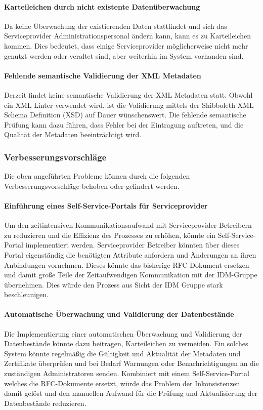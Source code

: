 \paragraph{Karteileichen durch nicht existente Datenüberwachung}
Da keine Überwachung der existierenden Daten stattfindet und sich das Serviceprovider Administrationspersonal ändern kann, kann es zu Karteileichen kommen.
Dies bedeutet, dass einige Serviceprovider möglicherweise nicht mehr genutzt werden oder veraltet sind, aber weiterhin im System vorhanden sind.

\paragraph{Fehlende semantische Validierung der XML Metadaten}

Derzeit findet keine semantische Validierung der XML Metadaten statt.
Obwohl ein XML Linter verwendet wird, ist die Validierung mittels der Shibboleth XML Schema Definition (XSD) auf Dauer wünschenswert.
Die fehlende semantische Prüfung kann dazu führen, dass Fehler bei der Eintragung auftreten, und die Qualität der Metadaten beeinträchtigt wird.

\subsubsection{Verbesserungsvorschläge}
Die oben angeführten Probleme können durch die folgenden Verbesserungsvorschläge behoben oder gelindert werden.

\paragraph{Einführung eines Self-Service-Portals für Serviceprovider}
Um den zeitintensiven Kommunikationsaufwand mit Serviceprovider Betreibern zu reduzieren und die Effizienz des Prozesses zu erhöhen, könnte ein Self-Service-Portal implementiert werden.
Serviceprovider Betreiber könnten über dieses Portal eigenständig die benötigten Attribute anfordern und Änderungen an ihren Anbindungen vornehmen.
Dieses könnte das bisherige RFC-Dokument ersetzen und damit große Teile der Zeitaufwendigen Kommunikation mit der IDM-Gruppe übernehmen. Dies würde den Prozess aus Sicht der IDM Gruppe stark beschleunigen.

\paragraph{Automatische Überwachung und Validierung der Datenbestände}
Die Implementierung einer automatischen Überwachung und Validierung der Datenbestände könnte dazu beitragen, Karteileichen zu vermeiden.
Ein solches System könnte regelmäßig die Gültigkeit und Aktualität der Metadaten und Zertifikate überprüfen und bei Bedarf Warnungen oder Benachrichtigungen an die zuständigen Administratoren senden.
Kombiniert mit einem Self-Service-Portal welches die RFC-Dokumente ersetzt, würde das Problem der Inkonsistenzen damit gelöst und den manuellen Aufwand für die Prüfung und Aktualisierung der Datenbestände reduzieren.

